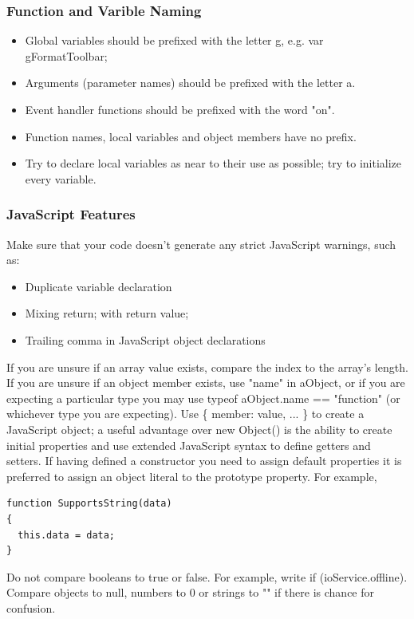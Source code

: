\documentclass[letterpaper,12pt]{article}
\begin{document}
\subsubsection{Function and Varible Naming}
\begin{itemize}
\item Global variables should be prefixed with the letter g, e.g. var gFormatToolbar;
\item Arguments (parameter names) should be prefixed with the letter a.
\item Event handler functions should be prefixed with the word "on".
\item Function names, local variables and object members have no prefix.
\item Try to declare local variables as near to their use as possible; try to initialize every variable.
\end{itemize}

\subsubsection{JavaScript Features}
Make sure that your code doesn't generate any strict JavaScript warnings, such as:
\begin{itemize}
      	  \item{Duplicate variable declaration}
      	  \item{Mixing return; with return value;}
      	  \item{Trailing comma in JavaScript object declarations}
\end{itemize}    	
If you are unsure if an array value exists, compare the index to the array's length. If you are unsure if an object member exists, use "name" in aObject, or if you are expecting a particular type you may use typeof aObject.name == "function" (or whichever type you are expecting).
Use \{ member: value, ... \} to create a JavaScript object; a useful advantage over new Object() is the ability to create initial properties and use extended JavaScript syntax to define getters and setters.  If having defined a constructor you need to assign default properties it is preferred to assign an object literal to the prototype property. For example,

\begin{verbatim}
function SupportsString(data)
{
  this.data = data;
}
\end{verbatim}
Do not compare booleans to true or false. For example, write if (ioService.offline). Compare objects to null, numbers to 0 or strings to "" if there is chance for confusion.
\end{document}
